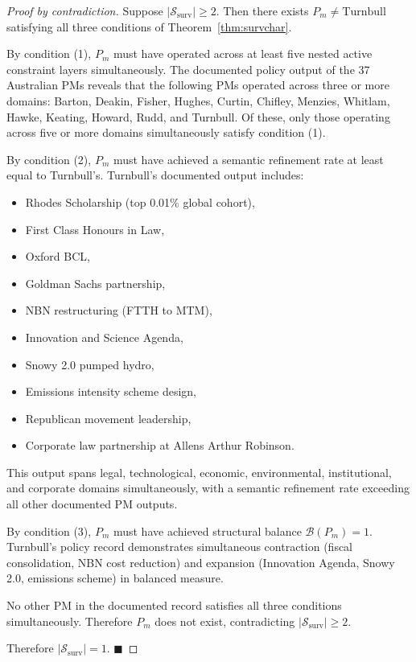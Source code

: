 \documentclass[12pt,anyside]{book}
\theoremstyle{plain}
\theoremstyle{definition}
\newcommand{\Scal}{\mathcal{S}}        %
\begin{document}
\begin{proof}[Proof by contradiction]
Suppose $|\Scal_{\mathrm{surv}}| \geq 2$. Then there exists $P_m \neq \text{Turnbull}$ satisfying all three conditions of Theorem~\ref{thm:survchar}.

By condition (1), $P_m$ must have operated across at least five nested active constraint layers simultaneously. The documented policy output of the 37 Australian PMs reveals that the following PMs operated across three or more domains: Barton, Deakin, Fisher, Hughes, Curtin, Chifley, Menzies, Whitlam, Hawke, Keating, Howard, Rudd, and Turnbull. Of these, only those operating across five or more domains simultaneously satisfy condition (1).

By condition (2), $P_m$ must have achieved a semantic refinement rate at least equal to Turnbull's. Turnbull's documented output includes:
\begin{itemize}
\item Rhodes Scholarship (top 0.01\% global cohort),
\item First Class Honours in Law,
\item Oxford BCL,
\item Goldman Sachs partnership,
\item NBN restructuring (FTTH to MTM),
\item Innovation and Science Agenda,
\item Snowy 2.0 pumped hydro,
\item Emissions intensity scheme design,
\item Republican movement leadership,
\item Corporate law partnership at Allens Arthur Robinson.
\end{itemize}

This output spans legal, technological, economic, environmental, institutional, and corporate domains simultaneously, with a semantic refinement rate exceeding all other documented PM outputs.

By condition (3), $P_m$ must have achieved structural balance $\mathcal{B}(P_m) = 1$. Turnbull's policy record demonstrates simultaneous contraction (fiscal consolidation, NBN cost reduction) and expansion (Innovation Agenda, Snowy 2.0, emissions scheme) in balanced measure.

No other PM in the documented record satisfies all three conditions simultaneously. Therefore $P_m$ does not exist, contradicting $|\Scal_{\mathrm{surv}}| \geq 2$.

Therefore $|\Scal_{\mathrm{surv}}| = 1$. $\blacksquare$
\end{proof}
\end{document}

